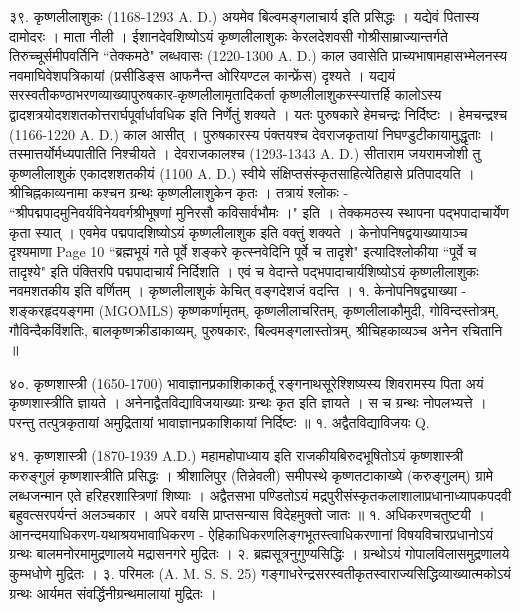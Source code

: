 ३९. कृष्णलीलाशुकः (1168-1293 A. D.)
अयमेव बिल्वमङ्गलाचार्य इति प्रसिद्धः । यद्येवं पितास्य दामोदरः । माता नीली । ईशानदेवशिष्योऽयं कृष्णलीलाशुकः केरलदेशवसी गोश्रीसाम्राज्यान्तर्गते तिरुच्चूर्समीपवर्तिनि ``तेक्कमठे" लब्धवासः (1220-1300 A. D.) काल उवासेति प्राच्यभाषामहासभ्मेलनस्य नवमाघिवेशपत्रिकायां (प्रसीडिङ्स आफनैन्त ओरियण्टल कान्फ्रेंस) दृश्यते ।
यद्ययं सरस्वतीकण्ठाभरणव्याख्यापुरुषकार-कृष्णलीलामृतादिकर्ता कृष्णलीलाशुकस्स्यात्तर्हि कालोऽस्य द्वादशत्रयोदशशतकोत्तरार्घपूर्वार्धावधिक इति निर्णेतुं शक्यते । यतः पुरुषकारे हेमचन्द्रः निर्दिष्टः । हेमचन्द्रश्च (1166-1220 A. D.) काल आसीत् । पुरुषकारस्य पंक्तयश्च देवराजकृतायां निघण्डुटीकायामुद्धृताः । तस्मात्तर्योर्मध्यपातीति निश्चीयते । देवराजकालश्च (1293-1343 A. D.) सीताराम जयरामजोशी तु कृष्णलीलाशुकं एकादशशतकीयं (1100 A. D.) स्वीये संक्षिप्तसंस्कृतसाहित्येतिहासे प्रतिपादयति ।
श्रीचिह्नकाव्यनामा कश्चन ग्रन्थः कृष्णलीलाशुकेन कृतः । तत्रायं श्लोकः - ``श्रीपद्मपादमुनिवर्यविनेयवर्गश्रीभूषणां मुनिरसौ कविसार्वभौमः ।" इति । तेक्कमठस्य स्थापना पद्भपादाचार्येण कृता स्यात् । एवमेव पद्मपादशिष्योऽयं कृष्णलीलाशुक इति वक्तुं शक्यते । केनोपनिषद्वयाख्यायाञ्च दृश्यमाणा Page 10 ``ब्रह्मभूयं गते पूर्वे शङ्करे कृत्स्नवेदिनि पूर्वे च तादृशे" इत्यादिश्लोकीया ``पूर्वे च तादृश्ये" इति पंक्तिरपि पद्मपादाचार्यं निर्दिशति । एवं च वेदान्ते पद्भपादाचार्यशिष्योऽयं कृष्णलीलाशुकः नवमशतकीय इति वर्णितम् । कृष्णलीलाशुकं केचित् वङ्गदेशजं वदन्ति ।
१. केनोपनिषद्व्याख्या - शङ्करहृदयङ्गमा (MGOMLS)
कृष्णकर्णामृतम्, कृष्णलीलाचरितम्, कृष्णलीलाकौमुदी, गोविन्दस्तोत्रम्, गौविन्दैकविंशतिः, बालकृष्णक्रीडाकाव्यम्, पुरुषकारः, बिल्वमङ्गलास्तोत्रम्, श्रीचिहकाव्यञ्च अनेेन रचितानि ॥

४०. कृष्णशास्त्री (1650-1700)
भावाज्ञानप्रकाशिकाकर्तू रङ्गनाथसूरेश्शिष्यस्य शिवरामस्य पिता अयं कृष्णशास्त्रीति ज्ञायते । अनेनाद्वैतविद्याविजयाख्याः ग्रन्थः कृत इति ज्ञायते । स च ग्रन्थः नोपलभ्यत्ते । परन्तु तत्पुत्रकृतायां अमुद्रितायां भावाज्ञानप्रकाशिकायां निर्दिष्टः ॥
१. अद्वैतविद्याविजयः Q.

४१. कृष्णशास्त्री (1870-1939 A.D.)
महामहोपाध्याय इति राजकीयबिरुदभूषितोऽयं कृष्णशास्त्री करुङ्गुलं कृष्णशास्त्रीति प्रसिद्धः । श्रीशालिपुर (तिन्नेवली) समीपस्थे कृष्णतटाकाख्ये (करुङ्गुलम्) ग्रामे लब्धजन्मान एते हरिहरशास्त्रिणां शिष्याः । अद्वैतसभा पण्डितोऽयं मद्रपुरीसंस्कृतकलाशालाप्रधानाध्यापकपदवी बहुवत्सरपर्यन्तं अलञ्चकार । अपरे वयसि प्राप्तसन्यास विदेहमुक्तो जातः ॥
१. अधिकरणचतुष्टयी ।
आनन्दमयाधिकरण-यथाश्रयभावाधिकरण - ऐहिकाधिकरणलिङ्गभूतस्त्वाधिकरणानां विषयविचारप्रधानोऽयं ग्रन्थः बालमनोरमामुद्रणालये मद्रासनगरे मुद्रितः ।
२. ब्रह्मसूत्रनुगुण्यसिद्धिः । ग्रन्थोऽयं गोपालविलासमुद्रणालये कुम्भधोणे मुद्रितः ।
३. परिमलः (A. M. S. S. 25)
गङ्गाधरेन्द्रसरस्वतीकृतस्वाराज्यसिद्धिव्याख्यात्मकोऽयं ग्रन्थः आर्यमत संवर्द्धिनीग्रन्थमालायां मुद्रितः ।

